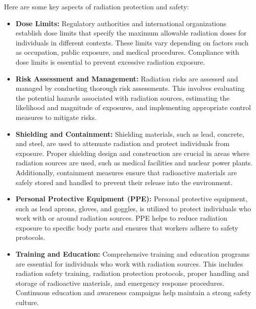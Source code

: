 \documentclass[../../Report.tex]{subfiles}
\begin{document}
        Here are some key aspects of radiation protection and safety:
        \begin{itemize}
            \item \textbf{Dose Limits:} Regulatory authorities and international organizations establish dose limits that specify the maximum 
            allowable radiation doses for individuals in different contexts. These limits vary depending on factors such as occupation, 
            public exposure, and medical procedures. Compliance with dose limits is essential to prevent excessive radiation exposure.

            \item \textbf{Risk Assessment and Management:} Radiation risks are assessed and managed by conducting thorough risk assessments. 
            This involves evaluating the potential hazards associated with radiation sources, estimating the likelihood and magnitude of 
            exposures, and implementing appropriate control measures to mitigate risks.

            \item \textbf{Shielding and Containment:} Shielding materials, such as lead, concrete, and steel, are used to attenuate radiation 
            and protect individuals from exposure. Proper shielding design and construction are crucial in areas where radiation sources are 
            used, such as medical facilities and nuclear power plants. Additionally, containment measures ensure that radioactive materials are 
            safely stored and handled to prevent their release into the environment.

            \item \textbf{Personal Protective Equipment (PPE):} Personal protective equipment, such as lead aprons, gloves, and goggles, is 
            utilized to protect individuals who work with or around radiation sources. PPE helps to reduce radiation exposure to specific body 
            parts and ensures that workers adhere to safety protocols.

            \item \textbf{Training and Education:} Comprehensive training and education programs are essential for individuals who work with 
            radiation sources. This includes radiation safety training, radiation protection protocols, proper handling and storage of 
            radioactive materials, and emergency response procedures. Continuous education and awareness campaigns help maintain a strong 
            safety culture.


\end{itemize}
\end{document}
